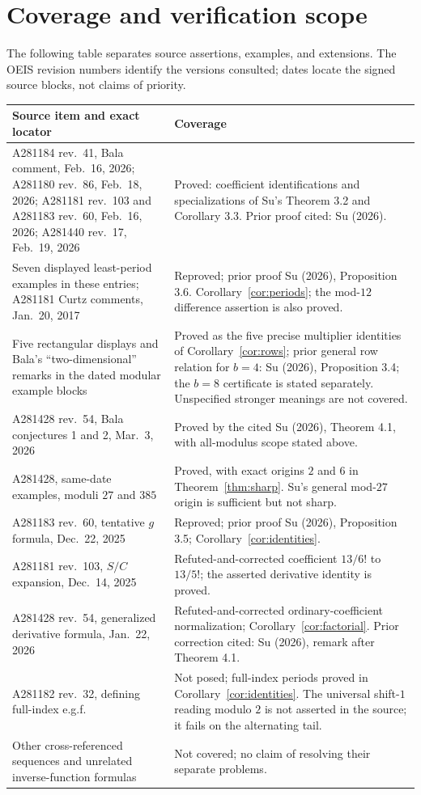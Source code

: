 \documentclass[11pt]{article}
\begin{document}
\section{Coverage and verification scope}
The following table separates source assertions, examples, and extensions.
The OEIS revision numbers identify the versions consulted; dates locate
the signed source blocks, not claims of priority.
\small
\begin{longtable}{@{}>{\raggedright\arraybackslash}p{}>{\raggedright\arraybackslash}p{}@{}}
\toprule Source item and exact locator & Coverage\\\midrule\endhead
A281184 rev.~41, Bala comment, Feb.~16, 2026;
A281180 rev.~86, Feb.~18, 2026;
A281181 rev.~103 and A281183 rev.~60, Feb.~16, 2026;
A281440 rev.~17, Feb.~19, 2026 &
Proved: coefficient identifications and specializations of Su's Theorem 3.2
and Corollary 3.3. Prior proof cited: Su (2026).\\
Seven displayed least-period examples in these entries; A281181 Curtz
comments, Jan.~20, 2017 &
Reproved; prior proof Su (2026), Proposition 3.6.
Corollary~\ref{cor:periods}; the mod-$12$ difference assertion is also proved.\\
Five rectangular displays and Bala's ``two-dimensional'' remarks in
the dated modular example blocks &
Proved as the five precise multiplier identities of
Corollary~\ref{cor:rows}; prior general row relation for $b=4$:
Su (2026), Proposition 3.4; the $b=8$ certificate is stated separately.
Unspecified stronger meanings are not covered.\\
A281428 rev.~54, Bala conjectures 1 and 2, Mar.~3, 2026 &
Proved by the cited Su (2026), Theorem 4.1, with all-modulus scope stated above.\\
A281428, same-date examples, moduli $27$ and $385$ &
Proved, with exact origins $2$ and $6$ in Theorem~\ref{thm:sharp}.
Su's general mod-$27$ origin is sufficient but not sharp.\\
A281183 rev.~60, tentative $g$ formula, Dec.~22, 2025 &
Reproved; prior proof Su (2026), Proposition 3.5;
Corollary~\ref{cor:identities}.\\
A281181 rev.~103, $S/C$ expansion, Dec.~14, 2025 &
Refuted-and-corrected coefficient $13/6!$ to $13/5!$;
the asserted derivative identity is proved.\\
A281428 rev.~54, generalized derivative formula, Jan.~22, 2026 &
Refuted-and-corrected ordinary-coefficient normalization;
Corollary~\ref{cor:factorial}. Prior correction cited: Su (2026), remark after Theorem 4.1.\\
A281182 rev.~32, defining full-index e.g.f. &
Not posed; full-index periods proved in Corollary~\ref{cor:identities}.
The universal shift-$1$ reading modulo $2$ is not asserted in the source;
it fails on the alternating tail.\\
Other cross-referenced sequences and unrelated inverse-function formulas &
Not covered; no claim of resolving their separate problems.\\\bottomrule
\end{longtable}
\normalsize
\end{document}
